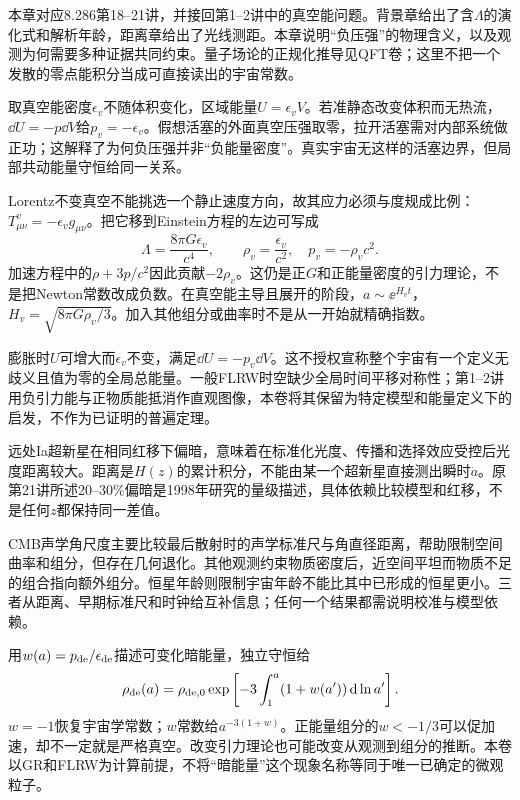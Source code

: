 本章对应8.286第18--21讲，并接回第1--2讲中的真空能问题。背景章给出了含$\Lambda$的演化式和解析年龄，距离章给出了光线测距。本章说明“负压强”的物理含义，以及观测为何需要多种证据共同约束。量子场论的正规化推导见QFT卷；这里不把一个发散的零点能积分当成可直接读出的宇宙常数。

取真空能密度$\epsilon_v$不随体积变化，区域能量$U=\epsilon_vV$。若准静态改变体积而无热流，$\dd U=-p\dd V$给$p_v=-\epsilon_v$。假想活塞的外面真空压强取零，拉开活塞需对内部系统做正功；这解释了为何负压强并非“负能量密度”。真实宇宙无这样的活塞边界，但局部共动能量守恒给同一关系。

Lorentz不变真空不能挑选一个静止速度方向，故其应力必须与度规成比例：$T_{\mu\nu}^{v}=-\epsilon_vg_{\mu\nu}$。把它移到Einstein方程的左边可写成
\[
 \Lambda=\frac{8\pi G\epsilon_v}{c^4},\qquad
 \rho_v=\frac{\epsilon_v}{c^2},\quad p_v=-\rho_vc^2.
\]
加速方程中的$\rho+3p/c^2$因此贡献$-2\rho_v$。这仍是正$G$和正能量密度的引力理论，不是把Newton常数改成负数。在真空能主导且展开的阶段，$a\sim\ee^{H_vt}$，$H_v=\sqrt{8\pi G\rho_v/3}$。加入其他组分或曲率时不是从一开始就精确指数。

膨胀时$U$可增大而$\epsilon_v$不变，满足$\dd U=-p_v\dd V$。这不授权宣称整个宇宙有一个定义无歧义且值为零的全局总能量。一般FLRW时空缺少全局时间平移对称性；第1--2讲用负引力能与正物质能抵消作直观图像，本卷将其保留为特定模型和能量定义下的启发，不作为已证明的普遍定理。

远处Ia超新星在相同红移下偏暗，意味着在标准化光度、传播和选择效应受控后光度距离较大。距离是$H(z)$的累计积分，不能由某一个超新星直接测出瞬时$\ddot a$。原第21讲所述20--30\%偏暗是1998年研究的量级描述，具体依赖比较模型和红移，不是任何$z$都保持同一差值。

CMB声学角尺度主要比较最后散射时的声学标准尺与角直径距离，帮助限制空间曲率和组分，但存在几何退化。其他观测约束物质密度后，近空间平坦而物质不足的组合指向额外组分。恒星年龄则限制宇宙年龄不能比其中已形成的恒星更小。三者从距离、早期标准尺和时钟给互补信息；任何一个结果都需说明校准与模型依赖。

用$w(a)=p_{\rm de}/\epsilon_{\rm de}$描述可变化暗能量，独立守恒给
\[
 \rho_{\rm de}(a)=\rho_{{\rm de},0}
 \exp\left[-3\int_1^a(1+w(a'))\,\mathrm d\ln a'\right].
\]
$w=-1$恢复宇宙学常数；$w$常数给$a^{-3(1+w)}$。正能量组分的$w<-1/3$可以促加速，却不一定就是严格真空。改变引力理论也可能改变从观测到组分的推断。本卷以GR和FLRW为计算前提，不将“暗能量”这个现象名称等同于唯一已确定的微观粒子。

